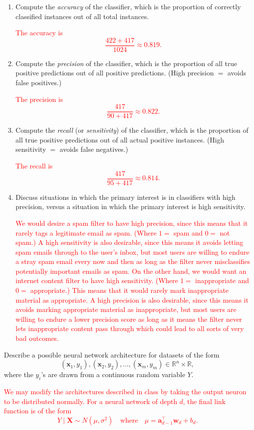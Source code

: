 \documentclass[12pt,reqno]{amsart}
\begin{document}
\medskip
\begin{enumerate}
\item Compute the \textit{accuracy} of the classifier, which is the proportion of correctly classified instances out of all total instances.

\bigskip
\textcolor{red}{The accuracy is
	\[\frac{422 + 417}{1024} \approx 0.819.
	\]}
\bigskip

\item Compute the \textit{precision} of the classifier, which is the proportion of all true positive predictions out of all positive predictions. (High precision $=$ avoids false positives.)

\bigskip
\textcolor{red}{The precision is
	\[\frac{417}{90 + 417} \approx 0.822.
	\]}
\bigskip

\item Compute the \textit{recall} (or \textit{sensitivity}) of the classifier, which is the proportion of all true positive predictions out of all actual positive instances. (High sensitivity $=$ avoids false negatives.)

\bigskip
\textcolor{red}{The recall is
	\[\frac{417}{95 + 417} \approx 0.814.
	\]}
\bigskip

\item Discuss situations in which the primary interest is in classifiers with high precision, versus a situation in which the primary interest is high sensitivity.

\bigskip
\textcolor{red}{We would desire a spam filter to have high precision, since this means that it rarely tags a legitimate email as spam. (Where $1=$ spam and $0=$ not spam.) A high sensitivity is also desirable, since this means it avoids letting spam emails through to the user's inbox, but most users are willing to endure a stray spam email every now and then as long as the filter never misclassifies potentially important emails as spam. On the other hand, we would want an internet content filter to have high sensitivity. (Where $1=$ inappropriate and $0=$ appropriate.) This means that it would rarely mark inappropriate material as appropriate. A high precision is also desirable, since this means it avoids marking appropriate material as inappropriate, but most users are willing to endure a lower precision score as long as it means the filter never lets inappropriate content pass through which could lead to all sorts of very bad outcomes.}
\bigskip
\end{enumerate}








\prob Describe a possible neural network architecture for datasets of the form
	\[(\mathbf{x}_1,y_1),(\mathbf{x}_2,y_2),\ldots,(\mathbf{x}_m,y_m) \in \mathbb{R}^n \times \mathbb{R},
	\]
where the $y_i$'s are drawn from a continuous random variable $Y$.

\bigskip
\textcolor{red}{We may modify the architectures described in class by taking the output neuron to be distributed normally. For a neural network of depth $d$, the final link function is of the form
	\[Y \mid \mathbf{X} \sim N(\mu,\sigma^2) \quad \text{where} \quad \mu = \mathbf{a}_{d-1} ^\intercal \mathbf{w}_d + b_d.
	\]}
\end{document}
